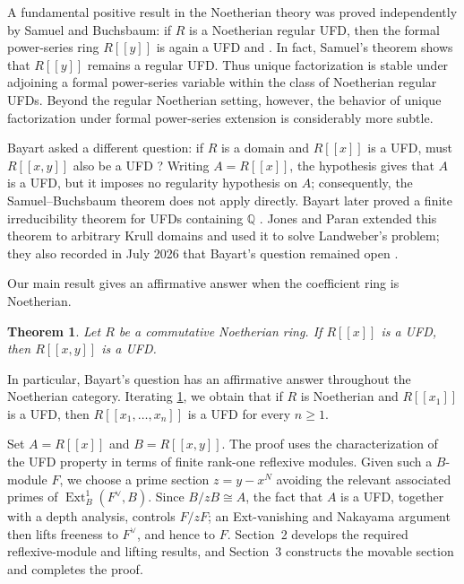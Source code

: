 \documentclass[reqno]{amsart}
\theoremstyle{plain}
\newtheorem{theorem}{Theorem}[section]
\theoremstyle{definition}
\newcommand{\Ext}{\operatorname{Ext}}
\begin{document}
A fundamental positive result in the Noetherian theory was proved
independently by Samuel and Buchsbaum: if \(R\) is a Noetherian regular UFD,
then the formal power-series ring \(R[[y]]\) is again a UFD
\cite[Theorem~2.1]{Samuel1961} and
\cite[Theorem~3.2]{Buchsbaum1961}.
In fact, Samuel's theorem shows that \(R[[y]]\) remains a regular UFD.
Thus unique factorization is stable under adjoining a formal power-series
variable within the class of Noetherian regular UFDs.  Beyond the regular
Noetherian setting, however, the behavior of unique factorization under
formal power-series extension is considerably more subtle.






Bayart asked a different question: if $R$ is a domain and $R[[x]]$ is a UFD,
must $R[[x,y]]$ also be a UFD \cite[p.~449]{Bayart1973}?  Writing
$A=R[[x]]$, the hypothesis gives that $A$ is a UFD, but it imposes no
regularity hypothesis on $A$; consequently, the Samuel--Buchsbaum theorem does
not apply directly.  Bayart later proved a finite irreducibility theorem for
UFDs containing $\mathbb Q$
\cite[\S IV, Th\'eor\`eme~(T)]{Bayart1981}.  Jones and Paran extended this
theorem to arbitrary Krull domains and used it to solve Landweber's problem;
they also recorded in July 2026 that Bayart's question remained open
\cite[Theorems~6.4 and~7.3, and \S7]{JonesParan2026}.

Our main result gives an affirmative answer when the coefficient ring is
Noetherian.

\begin{theorem}\label{thm:bayart-noetherian}
Let $R$ be a commutative Noetherian ring.  If $R[[x]]$ is a UFD, then
$R[[x,y]]$ is a UFD.
\end{theorem}

In particular, Bayart's question has an affirmative answer throughout the
Noetherian category.  Iterating \cref{thm:bayart-noetherian}, we obtain that if
$R$ is Noetherian and $R[[x_1]]$ is a UFD, then
$R[[x_1,\ldots,x_n]]$ is a UFD for every $n\geq 1$.

Set $A=R[[x]]$ and $B=R[[x,y]]$.  The proof uses the characterization of
the UFD property in terms of finite rank-one reflexive modules.  Given such a
$B$-module $F$, we choose a prime section $z=y-x^N$ avoiding the relevant
associated primes of $\Ext^1_B(F^\vee,B)$.  Since $B/zB\cong A$, the fact that
$A$ is a UFD, together with a depth analysis, controls $F/zF$; an Ext-vanishing
and Nakayama argument then
lifts freeness to $F^\vee$, and hence to $F$.  Section~2 develops the required
reflexive-module and lifting results, and Section~3 constructs the movable
section and completes the proof.
\end{document}
